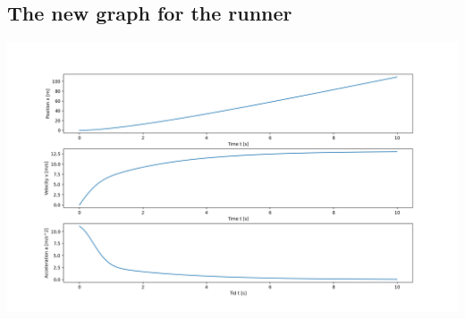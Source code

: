 \documentclass{article}
\begin{document}
            \clearpage
        
        \subsection*{The new graph for the runner}
            \includegraphics[width=1.2\textwidth,left]{../../graphs/sprinter_2.png}
            
\end{document}
